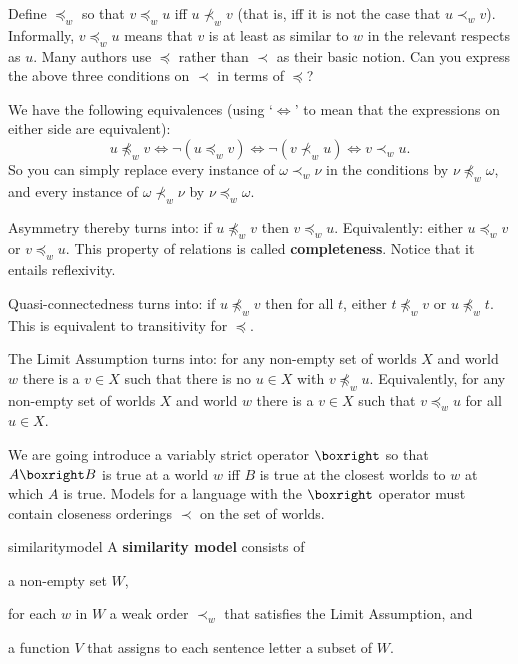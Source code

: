 \begin{exercise}
  Define $\preceq_{w}$ so that $v \preceq_w u$ iff $u \nprec_w v$ (that is, iff
  it is not the case that $u \prec_{w} v$). Informally, $v \preceq_w u$ means
  that $v$ is at least as similar to $w$ in the relevant respects as $u$. Many
  authors use $\preceq$ rather than $\prec$ as their basic notion. Can you
  express the above three conditions on $\prec$ in terms of $\preceq$?
\end{exercise}
\begin{solution}
  We have the following equivalences (using `$\Leftrightarrow$' to mean that the
  expressions on either side are equivalent):
  \[
    u \npreceq_w v \Leftrightarrow \neg (u \preceq_w v) \Leftrightarrow \neg(v \nprec_w u) \Leftrightarrow v \prec_w u.
  \]
  So you can simply replace every instance of $\omega \prec_{w} \nu$ in the
  conditions by $\nu \npreceq_{w} \omega$, and every instance of
  $\omega \nprec_{w} \nu$ by $\nu \preceq_{w} \omega$.

  Asymmetry thereby turns into: if $u \npreceq_{w} v$ then $v \preceq_{w} u$.
  Equivalently: either $u \preceq_{w} v$ or $v \preceq_{w} u$. This
  property of relations is called \textbf{completeness}. Notice that it
  entails reflexivity.

  Quasi-connectedness turns into: if $u \npreceq_{w} v$ then for all $t$, either
  $t \npreceq_{w} v$ or $u \npreceq_{w} t$. This is equivalent to transitivity
  for $\preceq$.


  The Limit Assumption turns into: for any non-empty set of worlds $X$ and world
  $w$ there is a $v\in X$ such that there is no $u \in X$ with
  $v \npreceq_{w} u$. Equivalently, for any non-empty set of worlds $X$
  and world $w$ there is a $v\in X$ such that $v \preceq_{w} u$ for all $u\in X$.
\end{solution}

We are going introduce a variably strict operator $\boxright$ so that
$A\boxright B$ is true at a world $w$ iff $B$ is true at the closest worlds to
$w$ at which $A$ is true. Models for a language with the $\boxright$ operator
must contain closeness orderings $\prec$ on the set of worlds.

\begin{definition}{}{similaritymodel}
  A \textbf{similarity model} consists of
  \vspace{-3mm}
  \begin{itemize*}
  \item a non-empty set $W$,
  \item for each $w$ in $W$ a weak order $\prec_w$ that satisfies the Limit
  Assumption, and
  \item a function $V$ that assigns to each sentence letter a subset of $W$.
  \end{itemize*}
\end{definition}

